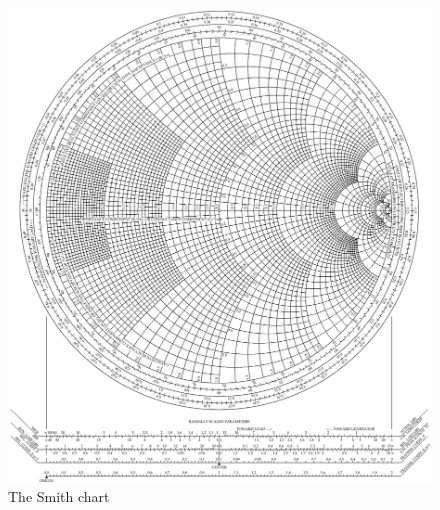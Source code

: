 \begin{figure}[!htp]
    \centering
    \includegraphics[width=\linewidth]{images/Transmission Line Theory/SmithChart.pdf}
    \caption{The Smith chart}
    \label{fig:SmithChart}
\end{figure}